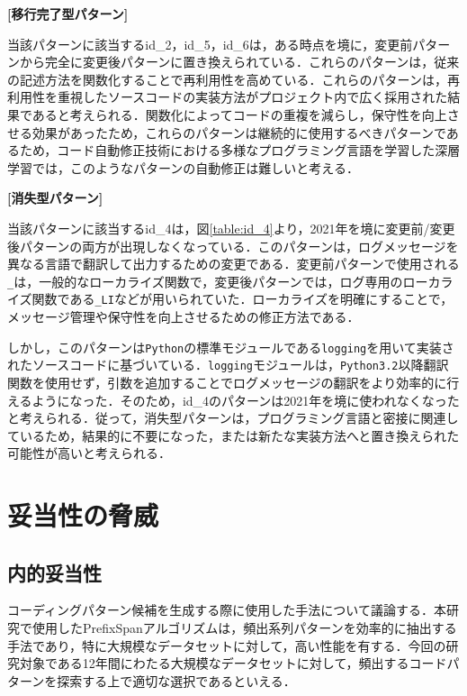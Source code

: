 \documentclass[submit,techrep,noauthor]{ipsj}
\begin{document}
\noindent\textbf{[移行完了型パターン] }

当該パターンに該当するid\_2，id\_5，id\_6は，ある時点を境に，変更前パターンから完全に変更後パターンに置き換えられている．これらのパターンは，従来の記述方法を関数化することで再利用性を高めている．これらのパターンは，再利用性を重視したソースコードの実装方法がプロジェクト内で広く採用された結果であると考えられる．関数化によってコードの重複を減らし，保守性を向上させる効果があったため，これらのパターンは継続的に使用するべきパターンであるため，コード自動修正技術における多様なプログラミング言語を学習した深層学習では，このようなパターンの自動修正は難しいと考える．

\noindent\textbf{[消失型パターン] }

当該パターンに該当するid\_4は，図\ref{table:id_4}より，2021年を境に変更前/変更後パターンの両方が出現しなくなっている．このパターンは，ログメッセージを異なる言語で翻訳して出力するための変更である．変更前パターンで使用される\texttt{\_}は，一般的なローカライズ関数で，変更後パターンでは，ログ専用のローカライズ関数である\texttt{\_LI}などが用いられていた．ローカライズを明確にすることで，メッセージ管理や保守性を向上させるための修正方法である．

しかし，このパターンは\texttt{Python}の標準モジュールである\texttt{logging}を用いて実装されたソースコードに基づいている．\texttt{logging}モジュールは，\texttt{Python3.2}以降翻訳関数を使用せず，引数を追加することでログメッセージの翻訳をより効率的に行えるようになった．そのため，id\_4のパターンは2021年を境に使われなくなったと考えられる．従って，消失型パターンは，プログラミング言語と密接に関連しているため，結果的に不要になった，または新たな実装方法へと置き換えられた可能性が高いと考えられる．

\section{妥当性の脅威}
\subsection{内的妥当性}
コーディングパターン候補を生成する際に使用した手法について議論する．本研究で使用したPrefixSpanアルゴリズムは，頻出系列パターンを効率的に抽出する手法であり，特に大規模なデータセットに対して，高い性能を有する．今回の研究対象である12年間にわたる大規模なデータセットに対して，頻出するコードパターンを探索する上で適切な選択であるといえる．
\end{document}
